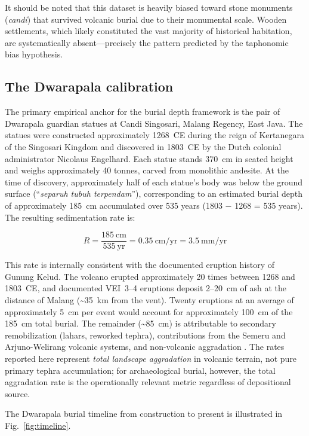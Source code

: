 \documentclass[12pt,a4paper]{article}
\begin{document}
It should be noted that this dataset is heavily biased toward stone monuments (\textit{candi}) that survived volcanic burial due to their monumental scale. Wooden settlements, which likely constituted the vast majority of historical habitation, are systematically absent---precisely the pattern predicted by the taphonomic bias hypothesis.

\subsection{The Dwarapala calibration}

The primary empirical anchor for the burial depth framework is the pair of Dwarapala guardian statues at Candi Singosari, Malang Regency, East Java. The statues were constructed approximately 1268~CE during the reign of Kertanegara of the Singosari Kingdom and discovered in 1803~CE by the Dutch colonial administrator Nicolaus Engelhard. Each statue stands 370~cm in seated height and weighs approximately 40 tonnes, carved from monolithic andesite. At the time of discovery, approximately half of each statue's body was below the ground surface (``\textit{separuh tubuh terpendam}''), corresponding to an estimated burial depth of approximately 185~cm accumulated over 535 years (1803 $-$ 1268 = 535 years). The resulting sedimentation rate is:

\begin{equation}
  R = \frac{185~\text{cm}}{535~\text{yr}} = 0.35~\text{cm/yr} = 3.5~\text{mm/yr}
\end{equation}

This rate is internally consistent with the documented eruption history of Gunung Kelud. The volcano erupted approximately 20 times between 1268 and 1803~CE, and documented VEI~3--4 eruptions deposit 2--20~cm of ash at the distance of Malang (\textasciitilde35~km from the vent). Twenty eruptions at an average of approximately 5~cm per event would account for approximately 100~cm of the 185~cm total burial. The remainder (\textasciitilde85~cm) is attributable to secondary remobilization (lahars, reworked tephra), contributions from the Semeru and Arjuno-Welirang volcanic systems, and non-volcanic aggradation \citep{gvp2024,maeno2019}. The rates reported here represent \textit{total landscape aggradation} in volcanic terrain, not pure primary tephra accumulation; for archaeological burial, however, the total aggradation rate is the operationally relevant metric regardless of depositional source.

The Dwarapala burial timeline from construction to present is illustrated in Fig.~\ref{fig:timeline}.
\end{document}
